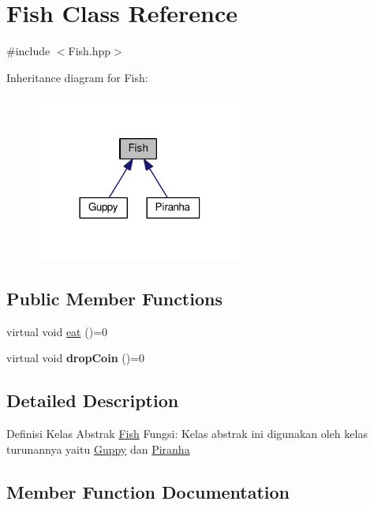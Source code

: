 \hypertarget{class_fish}{}\section{Fish Class Reference}
\label{class_fish}


{\ttfamily \#include $<$Fish.\+hpp$>$}



Inheritance diagram for Fish\+:
\nopagebreak
\begin{figure}[H]
\begin{center}
\leavevmode
\includegraphics[width=194pt]{class_fish__inherit__graph}
\end{center}
\end{figure}
\subsection*{Public Member Functions}
\begin{DoxyCompactItemize}
\item 
virtual void \mbox{\hyperlink{class_fish_af209980bd39b8de9b4bb38b7ad4edd04}{eat}} ()=0
\item 
\mbox{\label{class_fish_a899c7712639756297b9205e8bbcc2cf6}} 
virtual void {\bfseries drop\+Coin} ()=0
\end{DoxyCompactItemize}


\subsection{Detailed Description}
Definisi Kelas Abstrak \mbox{\hyperlink{class_fish}{Fish}} Fungsi\+: Kelas abstrak ini digunakan oleh kelas turunannya yaitu \mbox{\hyperlink{class_guppy}{Guppy}} dan \mbox{\hyperlink{class_piranha}{Piranha}} 

\subsection{Member Function Documentation}
\mbox{\label{class_fish_af209980bd39b8de9b4bb38b7ad4edd04}} 
